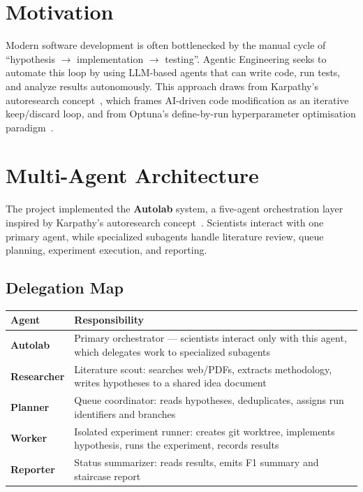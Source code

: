 \section{Motivation}\label{motivation-agentic}

Modern software development is often bottlenecked by the manual cycle of ``hypothesis \(\rightarrow\) implementation \(\rightarrow\) testing''. Agentic Engineering seeks to automate this loop by using LLM-based agents that can write code, run tests, and analyze results autonomously. This approach draws from Karpathy's autoresearch concept~\cite{karpathy2026autoresearch}, which frames AI-driven code modification as an iterative keep/discard loop, and from Optuna's define-by-run hyperparameter optimisation paradigm~\cite{akiba2019optuna}.

\section{Multi-Agent Architecture}\label{multi-agent-architecture}

The project implemented the \textbf{Autolab} system, a five-agent orchestration layer inspired by Karpathy's autoresearch concept~\cite{karpathy2026autoresearch}. Scientists interact with one primary agent, while specialized subagents handle literature review, queue planning, experiment execution, and reporting.

\subsection{Delegation Map}\label{delegation-map}

\begin{center}
\small
\begin{tabular}{@{}p{2.7cm} p{9.8cm}@{}}
\toprule
\textbf{Agent} & \textbf{Responsibility} \\
\midrule
\textbf{Autolab} & Primary orchestrator --- scientists interact only with this agent, which delegates work to specialized subagents \\
\textbf{Researcher} & Literature scout: searches web/PDFs, extracts methodology, writes hypotheses to a shared idea document \\
\textbf{Planner} & Queue coordinator: reads hypotheses, deduplicates, assigns run identifiers and branches \\
\textbf{Worker} & Isolated experiment runner: creates git worktree, implements hypothesis, runs the experiment, records results \\
\textbf{Reporter} & Status summarizer: reads results, emits F1 summary and staircase report \\
\bottomrule
\end{tabular}
\normalsize
\end{center}

